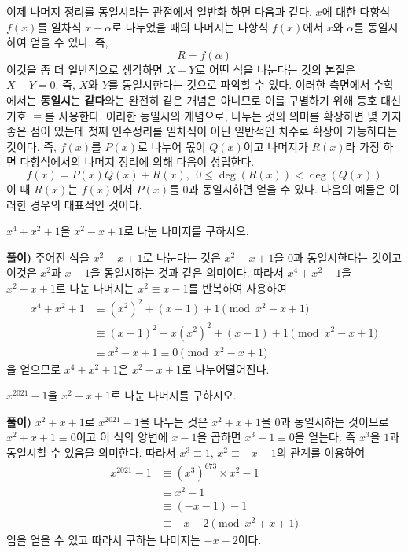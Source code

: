 \documentclass[a4paper]{article}
\begin{document}
  이제 나머지 정리를 동일시라는 관점에서 일반화 하면 다음과 같다.
 $x$에 대한 다항식 $f(x)$를 일차식 $x-\alpha$로 나누었을 때의 나머지는 다항식 $f(x)$에서 $x$와 $\alpha$를 동일시하여 얻을 수 있다. 즉,
\[
R=f(\alpha)
\]
  이것을 좀 더 일반적으로 생각하면 $X-Y$로 어떤 식을 나눈다는 것의 본질은  $X-Y=0$. 즉, $X$와 $Y$를 동일시한다는 것으로 파악할 수 있다. 이러한 측면에서 수학에서는 \textbf{동일시}는 \textbf{같다}와는 완전히 같은 개념은 아니므로 이를 구별하기 위해 등호 대신 기호 $\equiv$를 사용한다. 이러한 동일시의 개념으로, 나누는 것의 의미를 확장하면 몇 가지 좋은 점이 있는데 첫째 인수정리를 일차식이 아닌 일반적인 차수로 확장이 가능하다는 것이다. 즉, $f(x)$를 $P(x)$로 나누어 몫이 $Q(x)$이고 나머지가 $R(x)$라 가정 하면 다항식에서의 나머지 정리에 의해 다음이 성립한다.
\[
f(x) = P(x) Q(x) + R(x), \: \: 0 \leq \deg\left( R(x) \right) < \deg\left(Q(x) \right)
\]
이 때 $R(x)$는 $f(x)$에서 $P(x)$를 $0$과 동일시하면 얻을 수 있다. 다음의 예들은 이러한 경우의 대표적인 것이다.
\vspace{1em}
\begin{example}
 $x^4 + x^2 +1$을 $x^2 - x +1$로 나눈 나머지를 구하시오.
\end{example}

\textbf{풀이)} 주어진 식을 $x^2 - x +1$로 나눈다는 것은 $x^2 - x +1$을 $0$과 동일시한다는 것이고 이것은 $x^2$과 $x-1$을 동일시하는 것과 같은 의미이다. 따라서 $x^4 + x^2 +1$을 $x^2 - x +1$로 나눈 나머지는 $x^2 \equiv x -1$를 반복하여 사용하여
\begin{align*}
x^{4} + x^{2} + 1 & \equiv \left(x^2 \right)^2 + (x-1) +1 \pmod{x^{2} -x +1}\\
& \equiv (x-1)^2 + x \left(x^2 \right)^2 + (x-1) +1 \pmod{x^{2} -x +1} \\
& \equiv x^2 - x + 1 \equiv 0 \pmod{x^{2} -x +1}
\end{align*}
을 얻으므로 $x^4 + x^2 +1$은 $x^2 - x +1$로 나누어떨어진다.
\vspace{1em}
\begin{example}
 $x^{2021} -1$을 $x^2 + x +1$로 나눈 나머지를 구하시오.
\end{example}

\textbf{풀이)}  $x^2 + x +1$로 $x^{2021} -1$을 나누는 것은 $x^2 + x +1$을 $0$과 동일시하는 것이므로 $x^2 + x +1\equiv 0$이고 이 식의 양변에 $x-1$을 곱하면 $x^3 - 1\equiv 0$을 얻는다. 즉 $x^3$을 $1$과 동일시할 수 있음을 의미한다. 따라서 $x^3 \equiv 1$, $x^2 \equiv -x-1$의 관계를 이용하여
\begin{align*}
    x^{2021} -1 &\equiv \left(x^3 \right)^{673} \times x^{2} -1 \\
    &\equiv x^{2} - 1 \\
    &\equiv (-x-1) - 1 \\
    & \equiv -x -2  \pmod{x^{2} +x +1}
\end{align*}
임을 얻을 수 있고 따라서 구하는 나머지는 $-x-2$이다.
\end{document}
